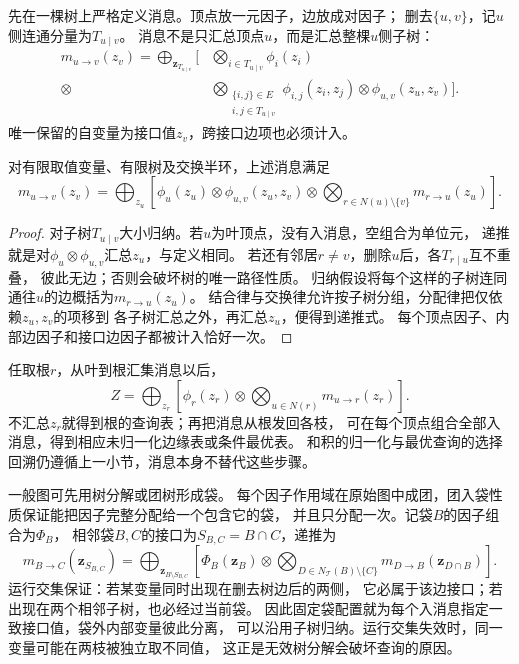 先在一棵树上严格定义消息。顶点放一元因子，边放成对因子；
删去\(\{u,v\}\)，记\(u\)侧连通分量为\(T_{u\mid v}\)。
消息不是只汇总顶点\(u\)，而是汇总整棵\(u\)侧子树：
\begin{equation}
  \begin{aligned}
    m_{u\to v}(z_v)
    =\bigoplus_{\bm z_{T_{u\mid v}}}
    \biggl[
      &\bigotimes_{i\in T_{u\mid v}}\phi_i(z_i)\\[-2pt]
      {}\otimes&
      \bigotimes_{\substack{\{i,j\}\in E\\i,j\in T_{u\mid v}}}
        \phi_{i,j}(z_i,z_j)
      \otimes\phi_{u,v}(z_u,z_v)
    \biggr].
  \end{aligned}
  \label{eq:graph-theory-tree-message-semantics}
\end{equation}
唯一保留的自变量为接口值\(z_v\)，跨接口边项也必须计入。

\begin{theorem}[树消息递推]
  \label{thm:graph-theory-tree-message-recursion}
  对有限取值变量、有限树及交换半环，上述消息满足
  \begin{equation}
    m_{u\to v}(z_v)=\bigoplus_{z_u}
    \left[
      \phi_u(z_u)\otimes\phi_{u,v}(z_u,z_v)
      \otimes\bigotimes_{r\in N(u)\setminus\{v\}}m_{r\to u}(z_u)
    \right].
    \label{eq:graph-theory-tree-message-recursion}
  \end{equation}
\end{theorem}

\begin{proof}
对子树\(T_{u\mid v}\)大小归纳。若\(u\)为叶顶点，没有入消息，空组合为单位元，
递推就是对\(\phi_u\otimes\phi_{u,v}\)汇总\(z_u\)，与定义相同。
若还有邻居\(r\neq v\)，删除\(u\)后，各\(T_{r\mid u}\)互不重叠，
彼此无边；否则会破坏树的唯一路径性质。
归纳假设将每个这样的子树连同通往\(u\)的边概括为\(m_{r\to u}(z_u)\)。
结合律与交换律允许按子树分组，分配律把仅依赖\(z_u,z_v\)的项移到
各子树汇总之外，再汇总\(z_u\)，便得到递推式。
每个顶点因子、内部边因子和接口边因子都被计入恰好一次。
\end{proof}

任取根\(r\)，从叶到根汇集消息以后，
\[
  Z=\bigoplus_{z_r}\left[\phi_r(z_r)\otimes
      \bigotimes_{u\in N(r)}m_{u\to r}(z_r)\right].
\]
不汇总\(z_r\)就得到根的查询表；再把消息从根发回各枝，
可在每个顶点组合全部入消息，得到相应未归一化边缘表或条件最优表。
和积的归一化与最优查询的选择回溯仍遵循上一小节，消息本身不替代这些步骤。

一般图可先用树分解或团树形成袋。
每个因子作用域在原始图中成团，团入袋性质保证能把因子完整分配给一个包含它的袋，
并且只分配一次。记袋\(B\)的因子组合为\(\Phi_B\)，
相邻袋\(B,C\)的接口为\(S_{B,C}=B\cap C\)，递推为
\[
  m_{B\to C}(\bm z_{S_{B,C}})
  =\bigoplus_{\bm z_{B\setminus S_{B,C}}}
    \left[
      \Phi_B(\bm z_B)\otimes
      \bigotimes_{D\in N_{\mathcal T}(B)\setminus\{C\}}
        m_{D\to B}(\bm z_{D\cap B})
    \right].
\]
运行交集保证：若某变量同时出现在删去树边后的两侧，
它必属于该边接口；若出现在两个相邻子树，也必经过当前袋。
因此固定袋配置就为每个入消息指定一致接口值，袋外内部变量彼此分离，
可以沿用子树归纳。运行交集失效时，同一变量可能在两枝被独立取不同值，
这正是无效树分解会破坏查询的原因。

